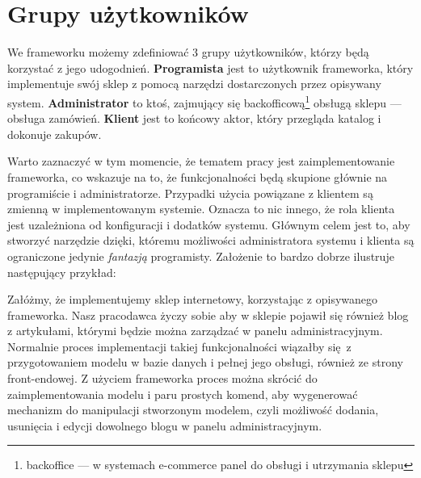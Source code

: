 \section{Grupy użytkowników}
We frameworku możemy zdefiniować 3 grupy użytkowników, którzy będą korzystać z jego udogodnień. \textbf{Programista} jest to użytkownik frameworka, który implementuje swój sklep z pomocą narzędzi dostarczonych przez opisywany system. \textbf{Administrator} to ktoś, zajmujący się backofficową\footnote{backoffice — w systemach e-commerce panel do obsługi i utrzymania sklepu} obsługą sklepu — obsługa zamówień. \textbf{Klient} jest to końcowy aktor, który przegląda katalog i dokonuje zakupów. 

Warto zaznaczyć w tym momencie, że tematem pracy jest zaimplementowanie frameworka, co wskazuje na to, że funkcjonalności będą skupione głównie na programiście i administratorze. Przypadki użycia powiązane z klientem są zmienną w implementowanym systemie. Oznacza to nic innego, że rola klienta jest uzależniona od konfiguracji i dodatków systemu. Głównym celem jest to, aby stworzyć narzędzie dzięki, któremu możliwości administratora systemu i klienta są ograniczone jedynie \textit{fantazją} programisty. Założenie to bardzo dobrze ilustruje następujący przykład:
\begin{example}
	Załóżmy, że implementujemy sklep internetowy, korzystając z opisywanego frameworka. Nasz pracodawca życzy sobie aby w sklepie pojawił się również blog z artykułami, którymi będzie można zarządzać w panelu administracyjnym. Normalnie proces implementacji takiej funkcjonalności wiązałby się z przygotowaniem modelu w bazie danych i pełnej jego obsługi, również ze strony front-endowej. Z użyciem frameworka proces można skrócić do zaimplementowania modelu i paru prostych komend, aby wygenerować mechanizm do manipulacji stworzonym modelem, czyli możliwość dodania, usunięcia i edycji dowolnego blogu w panelu administracyjnym.
\end{example}


